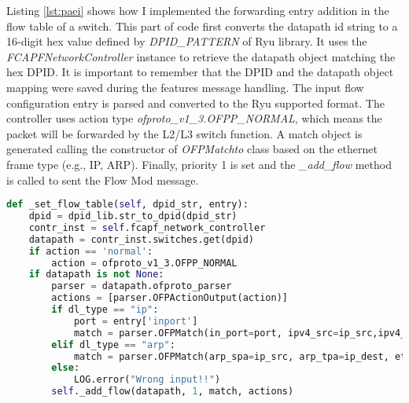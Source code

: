 Listing \ref{lst:paei} shows how I implemented the forwarding entry addition in the flow table of a switch. This part of code first converts the datapath id string to a 16-digit hex value defined by \textit{DPID\_PATTERN} of Ryu library. It uses the \textit{FCAPFNetworkController} instance to retrieve the datapath object matching the hex DPID. It is important to remember that the DPID and the datapath object mapping were saved during the features message handling. The input flow configuration entry is parsed and converted to the Ryu supported format. The controller uses action type \textit{ofproto\_v1\_3.OFPP\_NORMAL}, which means the packet will be forwarded by the L2/L3 switch function. A match object is generated calling the constructor of \textit{OFPMatchto} class based on the ethernet frame type (e.g., IP, ARP). Finally, priority 1 is set and the \textit{\_add\_flow} method is called to sent the Flow Mod message.

\begin{lstlisting}[caption={Processing add entry implementation},label={lst:paei},language=Python,tabsize=2,basicstyle=\footnotesize,breaklines=true, showspaces=false,showstringspaces=false,showtabs=false,frame=single]
def _set_flow_table(self, dpid_str, entry):
	dpid = dpid_lib.str_to_dpid(dpid_str)
	contr_inst = self.fcapf_network_controller
	datapath = contr_inst.switches.get(dpid)
	if action == 'normal':
		action = ofproto_v1_3.OFPP_NORMAL
	if datapath is not None:
		parser = datapath.ofproto_parser
		actions = [parser.OFPActionOutput(action)]
		if dl_type == "ip":
			port = entry['inport']
			match = parser.OFPMatch(in_port=port, ipv4_src=ip_src,ipv4_dst=ip_dest, eth_type=0x0800)
		elif dl_type == "arp":
			match = parser.OFPMatch(arp_spa=ip_src, arp_tpa=ip_dest, eth_type=0x0806)
		else:
			LOG.error("Wrong input!!")
		self._add_flow(datapath, 1, match, actions)
\end{lstlisting}

